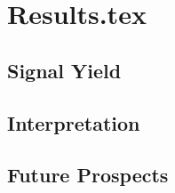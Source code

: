 \chapter{Results.tex}

\section{Signal Yield}

\section{Interpretation}

\section{Future Prospects}
